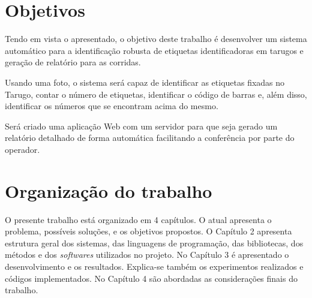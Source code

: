 \section{Objetivos} 

Tendo em vista o apresentado, o objetivo deste trabalho é desenvolver um sistema automático para a identificação robusta de etiquetas identificadoras em tarugos e geração de relatório para as corridas.

Usando uma foto, o sistema será capaz de identificar as etiquetas fixadas no Tarugo, contar o número de etiquetas, identificar o código de barras e, além disso, identificar os números que se encontram acima do mesmo.

Será criado uma aplicação Web com um servidor para que seja gerado um relatório detalhado de forma automática facilitando a conferência por parte do operador.


\section{Organização do trabalho}

O presente trabalho está organizado em 4 capítulos. O atual apresenta o problema, possíveis soluções, e os objetivos propostos.
%
O Capítulo 2 apresenta estrutura geral dos sistemas, das linguagens de programação, das bibliotecas, dos métodos e dos \textit{softwares} utilizados no projeto.
%
No Capítulo 3 é apresentado o desenvolvimento e os resultados. Explica-se também os experimentos realizados e códigos implementados.
%
No Capítulo 4 são abordadas as considerações finais do trabalho.